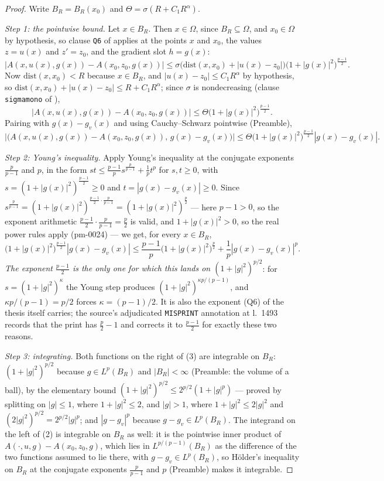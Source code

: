 \begin{proof}
Write $B_R=B_R(x_0)$ and $\Theta=\sigma(R+C_1R^{\alpha})$.

\emph{Step 1: the pointwise bound.}  Let $x\in B_R$.  Then $x\in\Omega$, since
$B_R\subseteq\Omega$, and $x_0\in\Omega$ by hypothesis, so clause \texttt{Q6} of
 applies at the points $x$ and $x_0$, the values
$z=u(x)$ and $z'=z_0$, and the gradient slot $h=g(x)$:
\[
\bigl|A(x,u(x),g(x))-A(x_0,z_0,g(x))\bigr|
\le\sigma\bigl(\mathrm{dist}(x,x_0)+|u(x)-z_0|\bigr)
\bigl(1+|g(x)|^2\bigr)^{\frac{p-1}2}.
\]
Now $\mathrm{dist}(x,x_0)<R$ because $x\in B_R$, and
$|u(x)-z_0|\le C_1R^{\alpha}$ by hypothesis, so
$\mathrm{dist}(x,x_0)+|u(x)-z_0|\le R+C_1R^{\alpha}$; since $\sigma$ is
nondecreasing (clause \texttt{sigmamono} of ),
\[
\bigl|A(x,u(x),g(x))-A(x_0,z_0,g(x))\bigr|
\le\Theta\bigl(1+|g(x)|^2\bigr)^{\frac{p-1}2}.
\tag{1}
\]
Pairing with $g(x)-g_v(x)$ and using Cauchy--Schwarz pointwise (Preamble),
\[
\bigl|\bigl(A(x,u(x),g(x))-A(x_0,z_0,g(x)),\,g(x)-g_v(x)\bigr)\bigr|
\le\Theta\bigl(1+|g(x)|^2\bigr)^{\frac{p-1}2}|g(x)-g_v(x)| .
\tag{2}
\]

\emph{Step 2: Young's inequality.}  Apply Young's inequality at the conjugate
exponents $\frac p{p-1}$ and $p$, in the form
$st\le\frac{p-1}ps^{\frac p{p-1}}+\frac1pt^{p}$ for $s,t\ge0$, with
$s=(1+|g(x)|^2)^{\frac{p-1}2}\ge0$ and $t=|g(x)-g_v(x)|\ge0$.  Since
$s^{\frac p{p-1}}=(1+|g(x)|^2)^{\frac{p-1}2\cdot\frac p{p-1}}
=(1+|g(x)|^2)^{\frac p2}$ --- here $p-1>0$, so the exponent arithmetic
$\frac{p-1}2\cdot\frac p{p-1}=\frac p2$ is valid, and $1+|g(x)|^2>0$, so the
real power rules apply (pm-0024) --- we get, for every $x\in B_R$,
\[
\bigl(1+|g(x)|^2\bigr)^{\frac{p-1}2}|g(x)-g_v(x)|
\le\frac{p-1}p\bigl(1+|g(x)|^2\bigr)^{\frac p2}+\frac1p|g(x)-g_v(x)|^p .
\tag{3}
\]
\emph{The exponent $\frac{p-1}2$ is the only one for which this lands on
$(1+|g|^2)^{p/2}$}: for $s=(1+|g|^2)^{\kappa}$ the Young step produces
$(1+|g|^2)^{\kappa p/(p-1)}$, and $\kappa p/(p-1)=p/2$ forces
$\kappa=(p-1)/2$.  It is also the exponent (Q6) of the thesis itself carries; the
source's adjudicated \texttt{MISPRINT} annotation at l.~1493 records that the
print has $\frac p2-1$ and corrects it to $\frac{p-1}2$ for exactly these two
reasons.

\emph{Step 3: integrating.}  Both functions on the right of (3) are integrable
on $B_R$: $(1+|g|^2)^{p/2}$ because $g\in L^p(B_R)$ and
$|B_R|<\infty$ (Preamble: the volume of a ball), by the elementary bound
$(1+|g|^2)^{p/2}\le2^{p/2}(1+|g|^p)$ --- proved by splitting on
$|g|\le1$, where $1+|g|^2\le2$, and $|g|>1$, where $1+|g|^2\le2|g|^2$ and
$(2|g|^2)^{p/2}=2^{p/2}|g|^p$; and $|g-g_v|^p$ because
$g-g_v\in L^p(B_R)$.  The integrand on the left of (2) is integrable on $B_R$
as well: it is the pointwise inner product of
$A(\cdot,u,g)-A(x_0,z_0,g)$, which lies in $L^{p/(p-1)}(B_R)$ as the difference
of the two functions assumed to lie there, with $g-g_v\in L^p(B_R)$, so
H\"older's inequality on $B_R$ at the conjugate exponents $\frac p{p-1}$ and
$p$ (Preamble) makes it integrable.


\end{proof}
